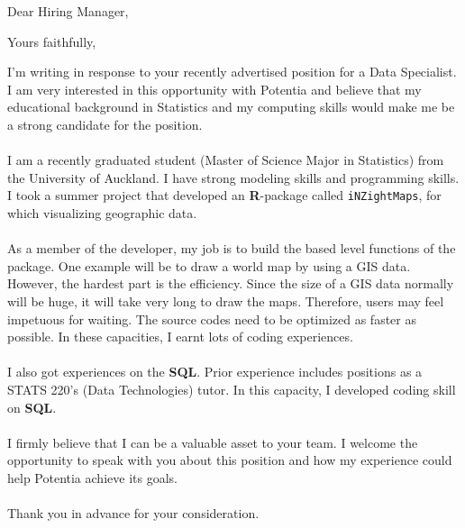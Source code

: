 \documentclass[12pt,a4paper,sans]{moderncv}        %
\title{}                               %
\begin{document}
	\date{\today}
	\opening{Dear Hiring Manager,}
	\closing{Yours faithfully,}
	\makelettertitle
		
	I’m writing in response to your recently advertised position for a Data Specialist. I am very interested in this opportunity with Potentia and believe that my educational background in Statistics and my computing skills would make me be a strong candidate for the position. \\~\\
	I am a recently graduated student (Master of Science Major in Statistics) from the University of Auckland. I have strong modeling skills and programming skills. I took a summer project that developed an \textbf{R}-package called \texttt{iNZightMaps}, for which visualizing geographic data. \\~\\
	As a member of the developer, my job is to build the based level functions of the package. One example will be to draw a world map by using a GIS data. 
	However, the hardest part is the efficiency. Since the size of a GIS data normally will be huge, it will take very long to draw the maps. Therefore, users may feel impetuous for waiting. The source codes need to be optimized as faster as possible. In these capacities, I earnt lots of coding experiences. \\~\\
	
	I also got experiences on the \textbf{SQL}. Prior experience includes positions as a STATS 220's (Data Technologies) tutor. In this capacity, I developed coding skill on \textbf{SQL}. \\~\\
	
	I firmly believe that I can be a valuable asset to your team. I welcome the opportunity to speak with you about this position and how my experience could help Potentia achieve its goals. \\~\\
	Thank you in advance for your consideration.

	\makeletterclosing
\end{document}
